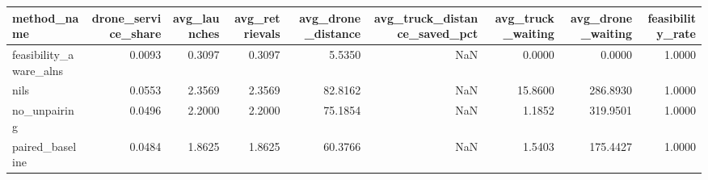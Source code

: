 \begin{tabular}{lrrrrrrrr}
\toprule
method_name & drone_service_share & avg_launches & avg_retrievals & avg_drone_distance & avg_truck_distance_saved_pct & avg_truck_waiting & avg_drone_waiting & feasibility_rate \\
\midrule
feasibility_aware_alns & 0.0093 & 0.3097 & 0.3097 & 5.5350 & NaN & 0.0000 & 0.0000 & 1.0000 \\
nils & 0.0553 & 2.3569 & 2.3569 & 82.8162 & NaN & 15.8600 & 286.8930 & 1.0000 \\
no_unpairing & 0.0496 & 2.2000 & 2.2000 & 75.1854 & NaN & 1.1852 & 319.9501 & 1.0000 \\
paired_baseline & 0.0484 & 1.8625 & 1.8625 & 60.3766 & NaN & 1.5403 & 175.4427 & 1.0000 \\
\bottomrule
\end{tabular}
